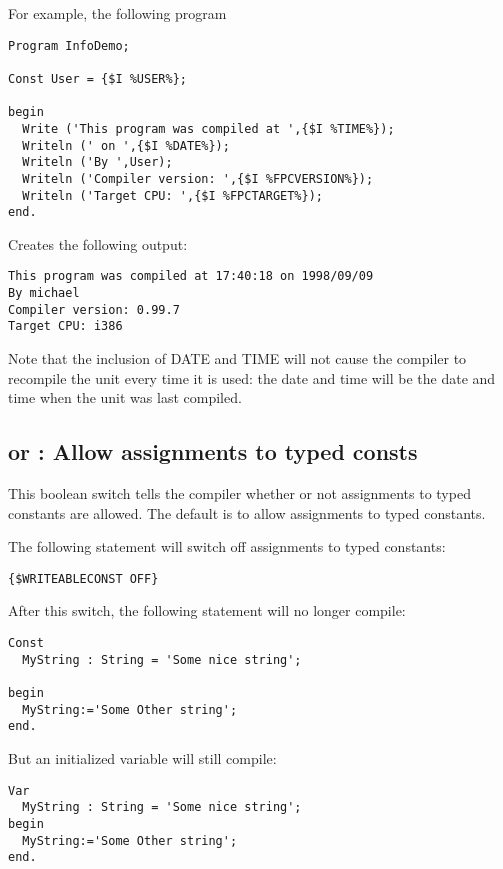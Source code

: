 For example, the following program
\begin{verbatim}
Program InfoDemo;

Const User = {$I %USER%};

begin
  Write ('This program was compiled at ',{$I %TIME%});
  Writeln (' on ',{$I %DATE%});
  Writeln ('By ',User);
  Writeln ('Compiler version: ',{$I %FPCVERSION%});
  Writeln ('Target CPU: ',{$I %FPCTARGET%});
end.
\end{verbatim}
Creates the following output:
\begin{verbatim}
This program was compiled at 17:40:18 on 1998/09/09
By michael
Compiler version: 0.99.7
Target CPU: i386
\end{verbatim}

\begin{remark}
Note that the inclusion of DATE and TIME will not cause the compiler to
recompile the unit every time it is used: the date and time will be the date
and time when the unit was last compiled.
\end{remark}


%
%

\subsection{ or  : Allow
assignments to typed consts}
This boolean switch tells the compiler whether or not assignments to typed 
constants are allowed. The default is to allow assignments to typed constants.

The following statement will switch off assignments to typed constants:
\begin{verbatim}
{$WRITEABLECONST OFF}
\end{verbatim}
After this switch, the following statement will no longer compile:
\begin{verbatim}
Const
  MyString : String = 'Some nice string';

begin
  MyString:='Some Other string';
end.
\end{verbatim}
But an initialized variable will still compile:
\begin{verbatim}
Var
  MyString : String = 'Some nice string';
begin
  MyString:='Some Other string';
end.
\end{verbatim}



